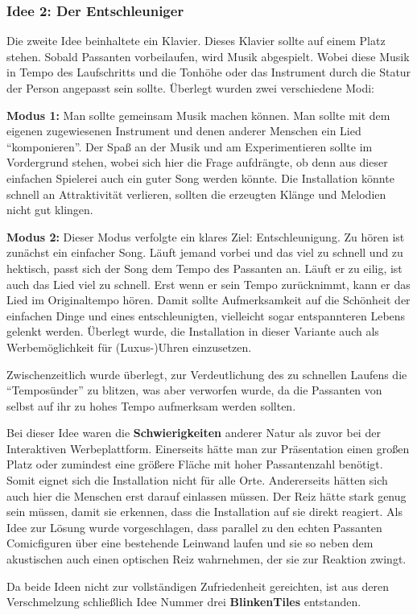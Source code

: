 \subsubsection{Idee 2: Der Entschleuniger}

Die zweite Idee beinhaltete ein Klavier. Dieses Klavier sollte auf einem Platz stehen. Sobald Passanten vorbeilaufen, wird Musik abgespielt. Wobei diese Musik in Tempo des Laufschritts und die Tonhöhe oder das Instrument durch die Statur der Person angepasst sein sollte. Überlegt wurden zwei verschiedene Modi:

\textbf{Modus 1:} Man sollte gemeinsam Musik machen können. Man sollte mit dem eigenen zugewiesenen Instrument und denen anderer Menschen ein Lied \enquote{komponieren}. Der Spaß an der Musik und am Experimentieren sollte im Vordergrund stehen, wobei sich hier die Frage aufdrängte, ob denn aus dieser einfachen Spielerei auch ein guter Song werden könnte. Die Installation könnte schnell an Attraktivität verlieren, sollten die erzeugten Klänge und Melodien nicht gut klingen.

\textbf{Modus 2:} Dieser Modus verfolgte ein klares Ziel: Entschleunigung. Zu hören ist zunächst ein einfacher Song. Läuft jemand vorbei und das viel zu schnell und zu hektisch, passt sich der Song dem Tempo des Passanten an. Läuft er zu eilig, ist auch das Lied viel zu schnell. Erst wenn er sein Tempo zurücknimmt, kann er das Lied im Originaltempo hören. Damit sollte Aufmerksamkeit auf die Schönheit der einfachen Dinge und eines entschleunigten, vielleicht sogar entspannteren Lebens gelenkt werden. Überlegt wurde, die Installation in dieser Variante auch als Werbemöglichkeit für (Luxus-)Uhren einzusetzen.

Zwischenzeitlich wurde überlegt, zur Verdeutlichung des zu schnellen Laufens die \enquote{Temposünder} zu blitzen, was aber verworfen wurde, da die Passanten von selbst auf ihr zu hohes Tempo aufmerksam werden sollten.

Bei dieser Idee waren die \textbf{Schwierigkeiten} anderer Natur als zuvor bei der Interaktiven Werbeplattform. Einerseits hätte man zur Präsentation einen großen Platz oder zumindest eine größere Fläche mit hoher Passantenzahl benötigt. Somit eignet sich die Installation nicht für alle Orte. Andererseits hätten sich auch hier die Menschen erst darauf einlassen müssen. Der Reiz hätte stark genug sein müssen, damit sie erkennen, dass die Installation auf sie direkt reagiert. Als Idee zur Lösung wurde vorgeschlagen, dass parallel zu den echten Passanten Comicfiguren über eine bestehende Leinwand laufen und sie so neben dem akustischen auch einen optischen Reiz wahrnehmen, der sie zur Reaktion zwingt.

Da beide Ideen nicht zur vollständigen Zufriedenheit gereichten, ist aus deren Verschmelzung schließlich Idee Nummer drei \textbf{BlinkenTiles} entstanden.